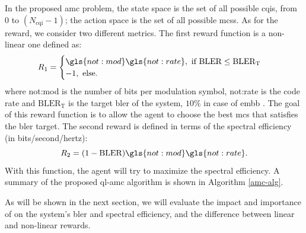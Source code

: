 In the proposed \gls{amc} problem, the state space is the set of all possible \gls{cqi}s, from $0$ to $(N_{\text{cqi}}-1)$; the action space is the set of all possible \gls{mcs}s. As for the reward, we consider two different metrics.
%
The first reward function is a non-linear one defined as:
\begin{equation}\label{eq.:rewardBler}
  R_1 = \begin{cases}
  \gls{not:mod} \gls{not:rate}, \text{ if } \textrm{BLER} \leq \textrm{BLER}_{\text{T}} \\
  -1, \text{ else.}
\end{cases}
\end{equation}
\noindent where \gls{not:mod} is the number of bits per modulation symbol, \gls{not:rate} is the code rate and $\textrm{BLER}_{\text{T}}$ is the target \gls{bler} of the system, $10\%$ in case of \gls{embb} \cite{3gpp.38.214}.
%
The goal of this reward function is to allow the agent to choose the best \gls{mcs} that satisfies the \gls{bler} target. The second reward is defined in terms of the spectral efficiency (in bits/second/hertz):
\begin{equation}\label{eq.:rewardSE}
    R_2 = (1-\textrm{BLER}) \gls{not:mod} \gls{not:rate} \text{.}
\end{equation}
\noindent With this function, the agent will try to maximize the spectral efficiency.
A summary of the proposed \gls{ql-amc} algorithm is shown in Algorithm \ref{amc-alg}.



As will be shown in the next section, we will evaluate the impact and importance of on the system's \gls{bler} and spectral efficiency, and the difference between linear and non-linear rewards.

